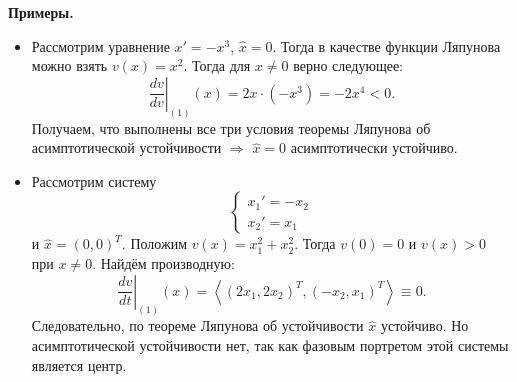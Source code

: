 \textbf{Примеры.}
\begin{itemize}
  \item Рассмотрим уравнение $x' = -x^3$, $\widehat{x} = 0$. Тогда в качестве функции Ляпунова можно взять $v(x) = x^2$. Тогда для $x \ne 0$ верно следующее:
  \[
    \left.\frac{dv}{dv}\right|_{(1)}(x) = 2x \cdot (-x^3) = -2x^4 < 0.
  \]
  Получаем, что выполнены все три условия теоремы Ляпунова об асимптотической устойчивости $\Rightarrow$ $\widehat{x} = 0$ асимптотически устойчиво.
  \item Рассмотрим систему 
  \[
      \begin{cases}
          x_1' = -x_2 \\
          x_2' = x_1
      \end{cases}
  \]
  и $\widehat{x} = (0, 0)^T$.
  Положим $v(x) = x_1^2 + x_2^2$. Тогда $v(0) = 0$ и $v(x) > 0$ при $x \ne 0$.
  Найдём производную:
  \[
      \left.\frac{dv}{dt}\right|_{(1)} (x) = \left< (2x_1, 2x_2)^T, (-x_2, x_1)^T \right> \equiv 0.
  \]
  Следовательно, по теореме Ляпунова об устойчивости $\widehat{x}$ устойчиво.
  Но асимптотической устойчивости нет, так как фазовым портретом этой системы является центр.
\end{itemize}